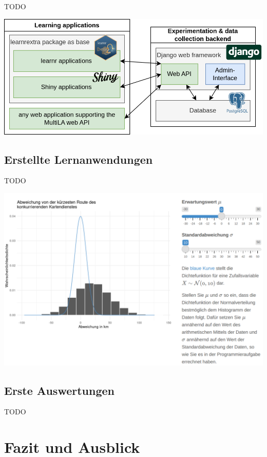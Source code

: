 \documentclass[a0,portrait]{a0poster}
\begin{document}
\begin{multicols}{2}
TODO

\begin{center}\vspace{1cm}
\includegraphics[width=0.7\linewidth]{sw-arch}
\end{center}\vspace{1cm}

\subsection*{Erstellte Lernanwendungen}

TODO

\begin{center}\vspace{1cm}
\includegraphics[width=0.7\linewidth]{wvstetig}
\end{center}\vspace{1cm}

\subsection*{Erste Auswertungen}

TODO

\section*{Fazit und Ausblick}



\nocite{*} %

\end{multicols}
\end{document}
